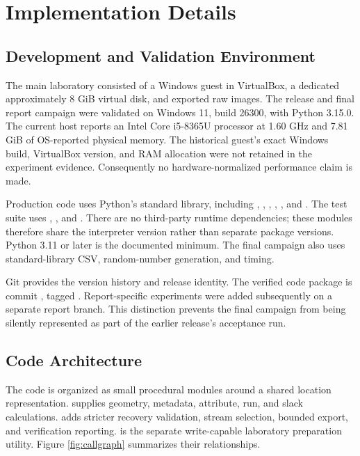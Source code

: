 \chapter{Implementation Details}
\section{Development and Validation Environment}
The main laboratory consisted of a Windows guest in VirtualBox, a dedicated
approximately 8 GiB virtual disk, and exported raw images. The release and
final report campaign were validated on Windows 11, build 26300, with
Python 3.15.0. The current host reports an Intel Core i5-8365U processor at
1.60 GHz and 7.81 GiB of OS-reported physical memory. The historical guest's
exact Windows build, VirtualBox version, and RAM allocation were not retained
in the experiment evidence. Consequently no hardware-normalized performance
claim is made.

Production code uses Python's standard library, including ,
, , , , and
. The test suite uses , , and
. There are no third-party runtime dependencies; these
modules therefore share the interpreter version rather than separate package
versions. Python 3.11 or later is the documented minimum. The final campaign
also uses standard-library CSV, random-number generation, and timing.

Git provides the version history and release identity. The verified code
package is commit , tagged . Report-specific
experiments were added subsequently on a separate report branch. This
distinction prevents the final campaign from being silently represented as
part of the earlier release's acceptance run.

\section{Code Architecture}
The code is organized as small procedural modules around a shared location
representation.  supplies geometry, metadata,
attribute, run, and slack calculations.  adds stricter
recovery validation, stream selection, bounded export, and verification
reporting.  is the separate write-capable laboratory
preparation utility. Figure \ref{fig:callgraph} summarizes their relationships.


